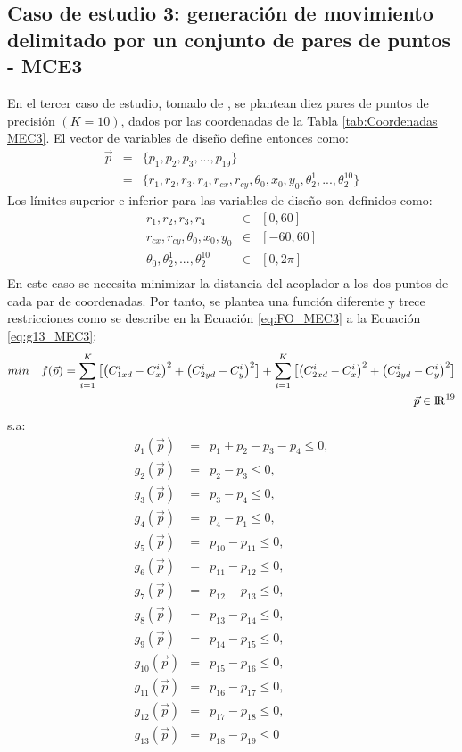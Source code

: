 \subsection{Caso de estudio 3: generación de movimiento delimitado por un conjunto de pares de puntos - MCE3}
En el tercer caso de estudio, tomado de \cite{Portilla_Mezura_MEC3}, se plantean diez pares de puntos de precisión $(K = 10)$, dados por las coordenadas de la Tabla \ref{tab:Coordenadas MEC3}. El vector de variables de diseño define entonces como:
\begin{eqnarray}\label{eq:Vector variables MEC1}
\vec{p} &=& \{p_1,p_2,p_3,...,p_{19} \}\\
       &=& \{ r_1,r_2,r_3,r_4,r_{cx},r_{cy},\theta_0,x_0,y_0,\theta^1_2,...,\theta^{10}_2 \} 
\end{eqnarray}
Los límites superior e inferior para las variables de diseño son definidos como:
\begin{eqnarray}\label{eq:limites variables MEC3}
r_1,r_2,r_3,r_4& \in & \left[ 0,60\right] \\
r_{cx},r_{cy},\theta_0,x_0,y_0 & \in & \left[ -60,60\right] \\
\theta_0,\theta^1_2,...,\theta^{10}_2& \in & \left[ 0,2\pi \right] \\
\end{eqnarray}
 En este caso se necesita minimizar la distancia del acoplador a los dos puntos de cada par de coordenadas. Por tanto, se plantea una función diferente y trece restricciones como se describe en la Ecuación \ref{eq:FO_MEC3} a la Ecuación \ref{eq:g13_MEC3}:
 \begin{equation}\label{eq:FO_MEC3}
 \begin{aligned}
min\quad  f(\vec{p})=
\sum_{i=1}^{K}\big[\big(C^{i}_{1xd}-C^{i}_{x} \big)^2 +\big(C^{i}_{2yd}-C^{i}_{y} \big)^2\big]+\sum_{i=1}^{K}\big[\big(C^{i}_{2xd}-C^{i}_{x} \big)^2 +\big(C^{i}_{2yd}-C^{i}_{y} \big)^2\big]
\\
\vec{p} \in  {\rm I\!R}^{19}
\end{aligned}
\end{equation}
s.a:
\begin{eqnarray}\label{eq:Restricciones MEC1}
g_{1}(\vec{p})&=&p_{1}+ p_{2}-p_{3}-p_{4} \leq 0,\\
g_{2}(\vec{p})&=&p_{2}-p_{3} \leq 0,\\
g_{3}(\vec{p})&=&p_{3}-p_{4} \leq 0,\\
g_{4}(\vec{p})&=&p_{4}-p_{1} \leq 0,\\
g_{5}(\vec{p})&=&p_{10}-p_{11} \leq 0,\\
g_{6}(\vec{p})&=&p_{11}-p_{12} \leq 0,\\
g_{7}(\vec{p})&=&p_{12}-p_{13} \leq 0,\\
g_{8}(\vec{p})&=&p_{13}-p_{14} \leq 0,\\
g_{9}(\vec{p})&=&p_{14}-p_{15} \leq 0,\\
g_{10}(\vec{p})&=&p_{15}-p_{16} \leq 0,\\
g_{11}(\vec{p})&=&p_{16}-p_{17} \leq 0,\\
g_{12}(\vec{p})&=&p_{17}-p_{18} \leq 0,\\
g_{13}(\vec{p})&=&p_{18}-p_{19} \leq 0 \label{eq:g13_MEC3}
\end{eqnarray}
